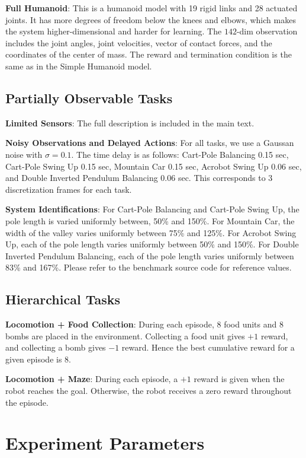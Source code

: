 \documentclass{article}
\begin{document}
{\bf Full Humanoid}: This is a humanoid model with 19 rigid links and 28 actuated joints. It has more degrees of freedom below the knees and elbows, which makes the system higher-dimensional and harder for learning. The $142$-dim observation includes the joint angles, joint velocities, vector of contact forces, and the coordinates of the center of mass. The reward and termination condition is the same as in the Simple Humanoid model.

\subsection{Partially Observable Tasks}

{\bf Limited Sensors}: The full description is included in the main text.

{\bf Noisy Observations and Delayed Actions}: For all tasks, we use a Gaussan noise with $\sigma=0.1$. The time delay is as follows: Cart-Pole Balancing 0.15 sec, Cart-Pole Swing Up 0.15 sec, Mountain Car 0.15 sec, Acrobot Swing Up 0.06 sec, and Double Inverted Pendulum Balancing 0.06 sec. This corresponds to $3$ discretization frames for each task.

{\bf System Identifications}: For Cart-Pole Balancing and Cart-Pole Swing Up, the pole length is varied uniformly between, 50\% and 150\%. For Mountain Car, the width of the valley varies uniformly between 75\% and 125\%. For Acrobot Swing Up, each of the pole length varies uniformly between 50\% and 150\%. For Double Inverted Pendulum Balancing, each of the pole length varies uniformly between 83\% and 167\%. Please refer to the benchmark source code for reference values.

\subsection{Hierarchical Tasks}

{\bf Locomotion + Food Collection}: During each episode, $8$ food units and $8$ bombs are placed in the environment. Collecting a food unit gives $+1$ reward, and collecting a bomb gives $-1$ reward. Hence the best cumulative reward for a given episode is $8$.

{\bf Locomotion + Maze}: During each episode, a $+1$ reward is given when the robot reaches the goal. Otherwise, the robot receives a zero reward throughout the episode. 

\section{Experiment Parameters}
\end{document}
